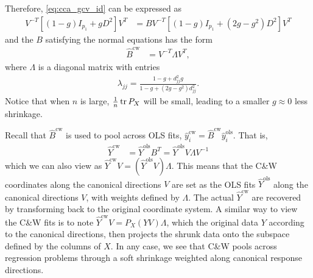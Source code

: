\documentclass[14pt]{extarticle}
\begin{document}
Therefore, \ref{eq:cca_gcv_id} can be expressed as
\begin{align*}
  V^{-T}\left[\left(1 - g\right)I_{p_{1}} + gD^{2}\right]V^{T} &=
  BV^{-T}\left[\left(1 - g\right)I_{p_{1}} + \left(2g -
      g^2\right)D^{2}\right]V^{T}
\end{align*}
and the $B$ satisfying the normal equations has the form
\begin{align*}
\hat{B}^{\text{cw}} &= V^{-T}\Lambda V^{T},
\end{align*}
where $\Lambda$ is a diagonal matrix with entries
\begin{align*}
\lambda_{jj} = \frac{1 - g + d_{jj}^{2}g}{1 - g + \left(2g -
    g^{2}\right)d_{jj}^{2}}.
\end{align*}
Notice that when $n$ is large, $\frac{1}{n}\mathop\mathrm{tr} P_{X}$ will be small, leading to
a smaller $g \approx 0$ less shrinkage.

Recall that $\hat{B}^{\text{cw}}$ is used to pool across OLS fits,
$\hat{y}_{i}^{\text{cw}} = \hat{B}^{\text{cw}}\hat{y}_{i}^{\text{ols}}$. That
is,
\begin{align*}
\hat{Y}^{\text{cw}} &= \hat{Y}^{\text{ols}}B^{T} =
\hat{Y}^{\text{ols}}V\Lambda V^{-1}
\end{align*}
which we can also view as $\hat{Y}^{\text{cw}}V =
\left(\hat{Y}^{\text{ols}}V\right)\Lambda$. This means that the C\&W coordinates
along the canonical directions $V$ are set as the OLS fits
$\hat{Y}^{\text{ols}}$ along the canonical directions $V$, with weights defined
by $\Lambda$. The actual $\hat{Y}^{\text{cw}}$ are recovered by transforming
back to the original coordinate system. A similar way to view the C\&W fits is
to note $\hat{Y}^{\text{cw}}V = P_{X}\left(YV\right)\Lambda$, which the original
data $Y$ according to the canonical directions, then projects the shrunk data
onto the subspace defined by the columns of $X$. In any case, we see that C\&W
pools across regression problems through a soft shrinkage weighted along
canonical response directions.
\end{document}
